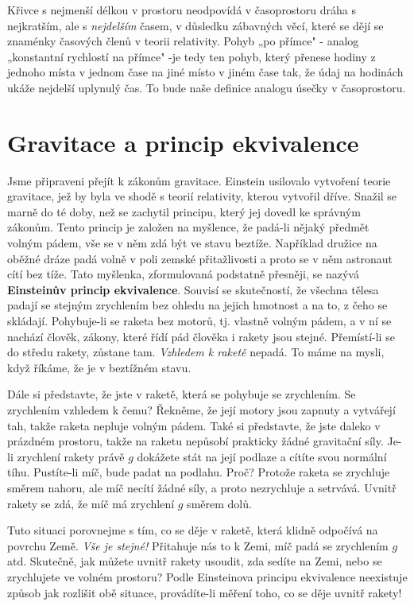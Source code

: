 {    Křivce s nejmenší délkou v prostoru neodpovídá v časoprostoru dráha s nejkratším, ale s 
    \emph{nejdelším} časem, v důsledku zábavných věcí, které se dějí se znaménky časových členů v 
    teorii relativity. Pohyb „po přímce" - analog „konstantní rychlostí na přímce" -je tedy ten 
    pohyb, který přenese hodiny z jednoho místa v jednom čase na jiné místo v jiném čase tak, že 
    údaj na hodinách ukáže nejdelší uplynulý čas. To bude naše definice analogu úsečky v 
    časoprostoru.
    
  \section{Gravitace a princip ekvivalence}\label{fyz:IIchapXLIIsecV}
    Jsme připraveni přejít k zákonům gravitace. Einstein usilovalo vytvoření teorie gravitace, jež 
    by byla ve shodě s teorií relativity, kterou vytvořil dříve. Snažil se marně do té doby, než se 
    zachytil principu, který jej dovedl ke správným zákonům. Tento princip je založen na myšlence, 
    že padá-li nějaký předmět volným pádem, vše se v něm zdá být ve stavu beztíže. Například 
    družice na oběžné dráze padá volně v poli zemské přitažlivosti a proto se v něm astronaut cítí 
    bez tíže. Tato myšlenka, zformulovaná podstatně přesněji, se nazývá \textbf{Einsteinův princip 
    ekvivalence}. Souvisí se skutečností, že všechna tělesa padají se stejným zrychlením bez ohledu 
    na jejich hmotnost a na to, z čeho se skládají. Pohybuje-li se raketa bez motorů, tj. vlastně 
    volným pádem, a v ní se nachází člověk, zákony, které řídí pád člověka i rakety jsou stejné. 
    Přemístí-li se do středu rakety, zůstane tam. \emph{Vzhledem k raketě} nepadá. To máme na 
    mysli, když říkáme, že je v beztížném stavu.
    
    Dále si představte, že jste v raketě, která se pohybuje se zrychlením. Se zrychlením vzhledem k 
    čemu? Řekněme, že její motory jsou zapnuty a vytvářejí tah, takže raketa nepluje volným pádem. 
    Také si představte, že  jste daleko v prázdném prostoru, takže na raketu nepůsobí prakticky 
    žádné gravitační síly. Je-li zrychlení rakety právě \(g\) dokážete stát na její podlaze a 
    cítíte svou normální tíhu. Pustíte-li míč, bude padat na podlahu. Proč? Protože raketa se 
    zrychluje směrem nahoru, ale míč necítí žádné síly, a proto nezrychluje a setrvává. Uvnitř 
    rakety se zdá, že míč má zrychlení \(g\) směrem dolů.
    
    Tuto situaci porovnejme s tím, co se děje v raketě, která klidně odpočívá na povrchu Země. 
    \emph{Vše je stejné!} Přitahuje nás to k Zemi, míč padá se zrychlením \(g\) atd. Skutečně, jak 
    můžete uvnitř rakety usoudit, zda sedíte na Zemi, nebo se zrychlujete ve volném prostoru? Podle 
    Einsteinova principu ekvivalence neexistuje způsob jak rozlišit obě situace, provádíte-li 
    měření toho, co se děje uvnitř rakety!
    
}
